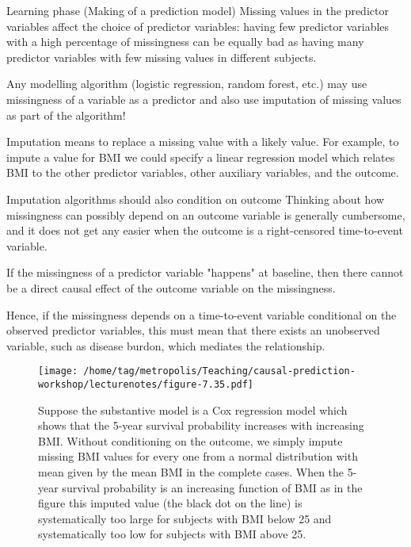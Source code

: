 \documentclass{beamer}\usepackage{listings}
\begin{document}
\begin{frame}[label={sec:orgfec658b}]{Learning phase (Making of a prediction model)}
Missing values in the predictor variables affect the choice of
predictor variables: having few predictor variables with a high percentage of
missingness can be equally bad as having many predictor variables with few missing values in different subjects.
\vfill

Any modelling algorithm (logistic regression, random forest, etc.) may
use missingness of a variable as a predictor and also use imputation
of missing values as part of the algorithm!

\vfill

Imputation means to replace a missing value with a likely value.  For
example, to impute a value for BMI we could specify a linear
regression model which relates BMI to the other predictor variables,
other auxiliary variables, and the outcome.
\end{frame}
\begin{frame}[label={sec:org73a84a1}]{Imputation algorithms should also condition on outcome}
Thinking about how missingness can possibly depend on an outcome
variable is generally cumbersome, and it does not get any easier
when the outcome is a right-censored time-to-event variable.
\vfill

If the missingness of a predictor variable "happens" at baseline, then
there cannot be a direct causal effect of the outcome variable on the
missingness. 
\vfill

Hence, if the missingness depends on a time-to-event
variable conditional on the observed predictor variables, this must
mean that there exists an unobserved variable, such as disease burdon,
which mediates the relationship.
\end{frame}
\begin{frame}[label={sec:org4d28b2f},shrink=25]{}
\begin{figure}[htbp]
\centering
\texttt{[image: /home/tag/metropolis/Teaching/causal-prediction-workshop/lecturenotes/figure-7.35.pdf]}
\caption{Suppose the substantive model is a Cox regression model which shows that the 5-year survival probability increases with increasing BMI. Without conditioning on the outcome, we simply impute missing BMI values for every one from a normal distribution with mean given by the mean BMI in the complete cases. When the 5-year survival probability is an increasing function of BMI as in the figure this imputed value (the black dot on the line) is systematically too large for subjects with BMI below 25 and systematically too low for subjects with BMI above 25.}
\end{figure}
\end{frame}
\end{document}

